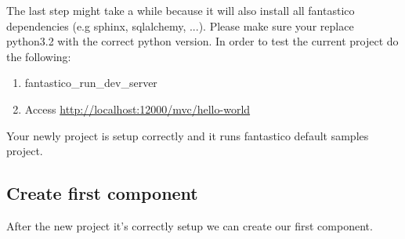 \documentclass[letterpaper,10pt,english]{sphinxmanual}
\begin{document}
The last step might take a while because it will also install all fantastico dependencies (e.g sphinx, sqlalchemy, ...).
Please make sure your replace python3.2 with the correct python version.
In order to test the current project do the following:
\begin{enumerate}
\item {} 
fantastico\_run\_dev\_server

\item {} 
Access \href{http://localhost:12000/mvc/hello-world}{http://localhost:12000/mvc/hello-world}

\end{enumerate}

Your newly project is setup correctly and it runs fantastico default samples project.


\subsection{Create first component}
\label{how_to/new_project_how_to:create-first-component}
After the new project it's correctly setup we can create our first component.
\end{document}
